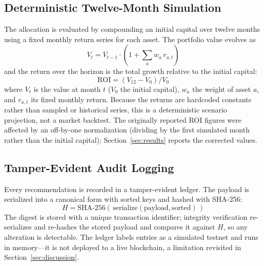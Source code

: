 \subsection{Deterministic Twelve-Month Simulation}\label{subsec:simulation}
The allocation is evaluated by compounding an initial capital over twelve months using a
fixed monthly return series for each asset. The portfolio value evolves as
\begin{equation}\label{eq:portfolio}
V_t = V_{t-1}\cdot\left(1 + \sum_a w_a\, r_{a,t}\right)
\end{equation}
and the return over the horizon is the total growth relative to the initial capital:
\begin{equation}\label{eq:roi}
\mathrm{ROI} = (V_{12} - V_0)/V_0
\end{equation}
where $V_t$ is the value at month $t$ ($V_0$ the initial capital), $w_a$ the weight of
asset $a$, and $r_{a,t}$ its fixed monthly return. Because the returns are hardcoded
constants rather than sampled or historical series, this is a deterministic scenario
projection, not a market backtest. The originally reported ROI figures were affected by
an off-by-one normalization (dividing by the first simulated month rather than the
initial capital); Section~\ref{sec:results} reports the corrected values.

\subsection{Tamper-Evident Audit Logging}\label{subsec:audit-log}
Every recommendation is recorded in a tamper-evident ledger. The payload is serialized
into a canonical form with sorted keys and hashed with SHA-256:
\begin{equation}\label{eq:hash}
H = \text{SHA-256}(\,\text{serialize}(\text{payload}, \text{sorted})\,)
\end{equation}
The digest is stored with a unique transaction identifier; integrity verification
re-serializes and re-hashes the stored payload and compares it against $H$, so any
alteration is detectable. The ledger labels entries as a simulated testnet and runs in
memory---it is not deployed to a live blockchain, a limitation revisited in
Section~\ref{sec:discussion}.
